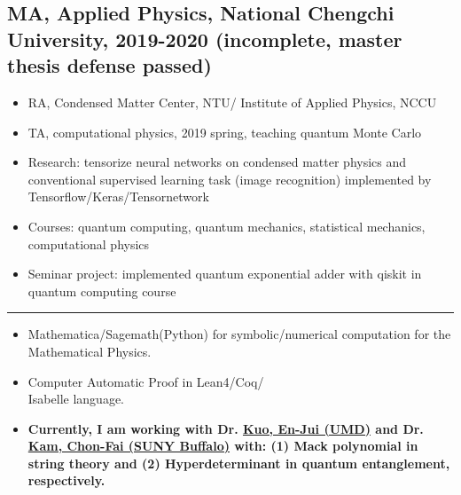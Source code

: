 \documentclass[11pt]{article}
\begin{document}
\begin{multicols*}{2}
\begin{educationbox}
\begin{itemize}[noitemsep]
    \end{itemize}

\subsection*{MA, Applied Physics, National Chengchi University, 2019-2020 (incomplete, master thesis defense passed)}

    \begin{itemize}[noitemsep]
        \item RA, Condensed Matter Center, NTU/ Institute of Applied Physics, NCCU
        \item TA, computational physics, 2019 spring, teaching quantum Monte Carlo
        \item Research: tensorize neural networks on condensed matter physics and conventional supervised learning task (image recognition) implemented by Tensorflow/Keras/Tensornetwork
        \item Courses: quantum computing, quantum mechanics, statistical mechanics, computational physics
        \item Seminar project: implemented quantum exponential adder with qiskit in quantum computing course
\end{itemize}
\end{educationbox}

\hrule

\begin{researchbox}
\begin{itemize}[noitemsep]
    \item Mathematica/Sagemath(Python) for symbolic/numerical computation for the Mathematical Physics.
    \item Computer Automatic Proof in Lean4/Coq/\\Isabelle language.  
    \item \textbf{ Currently, I am working with Dr. \href{https://www.bing.com/search?q=en-jui+kuo&gs_lcrp=EgZjaHJvbWUqBggBEEUYOzIGCAAQRRg5MgYIARBFGDsyBggCEEUYOzIGCAMQRRg7MgYIBBAAGEAyBggFEAAYQDIGCAYQRRg9MgYIBxBFGDwyBggIEEUYPNIBCDE2NjVqMGoxqAIAsAIA&FORM=ANAB01&PC=HCTS}{Kuo, En-Jui (UMD)} and Dr. \href{https://scholar.google.com/hk/citations?user=38TPAxMAAAAJ&hl=en}{Kam, Chon-Fai (SUNY Buffalo)} with: (1) Mack polynomial in string theory and (2) Hyperdeterminant in quantum entanglement, respectively. }
\end{itemize}
\end{researchbox}


\end{multicols*}
\end{document}
